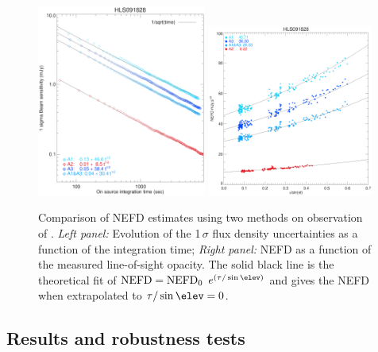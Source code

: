 \begin{figure}[!thbp]
  \begin{center}
    \includegraphics[trim={0.5cm, 0.5cm, 1.5cm, 1.8cm}, clip, angle=0, width=0.495\textwidth]{Figures/hls_nefd_vst.eps}
    \includegraphics[trim={0.5cm, 0, 0.2cm, 0.5cm}, clip, angle=0, width=0.485\textwidth]{Figures/hls_NEFD_vs_TauElev_all.eps}
    \caption{Comparison of NEFD estimates using two methods on
      observation of \hls. \emph{Left panel:} Evolution of the 1\,$\sigma$ flux density uncertainties as a function of the integration time; \emph{Right panel:} NEFD as a function of the measured line-of-sight opacity. The solid black line is the theoretical fit of $\rm{NEFD} = \rm{NEFD}_0$ $e^{(\tau/\sin\elev)}$ and gives the NEFD when extrapolated to $\tau/\sin\elev = 0$.}
    \label{fig:nefd_twomethods}
  \end{center}
\end{figure}

\subsection{Results and robustness tests}
\label{se:nefd_results}

